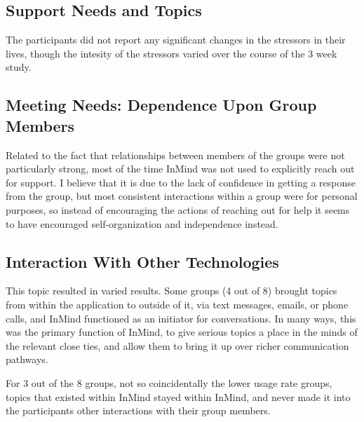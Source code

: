   \subsection{Support Needs and Topics}
    The participants did not report any significant changes in the stressors
    in their lives,
    though the intesity of the stressors varied over the course of the 3 week study.
  
  \subsection{Meeting Needs: Dependence Upon Group Members}
    Related to the fact that relationships between members of the groups
    were not particularly strong,
    most of the time InMind was not used to explicitly reach out for support.
    I believe that it is due to the lack of confidence in getting a response
    from the group,
    but most consistent interactions within a group were for personal purposes,
    so instead of encouraging the actions of reaching out for help
    it seems to have encouraged self-organization and independence instead.

  \subsection{Interaction With Other Technologies}
    This topic resulted in varied results.
    Some groups (4 out of 8) brought topics from within the application to outside
    of it, via text messages, emails, or phone calls,
    and InMind functioned as an initiator for conversations.
    In many ways, this was the primary function of InMind,
    to give serious topics a place in the minds of the relevant close ties,
    and allow them to bring it up over richer communication pathways.

    For 3 out of the 8 groups, not so coincidentally the lower usage rate groups,
    topics that existed within InMind stayed within InMind,
    and never made it into the participants other interactions with their group
    members.

